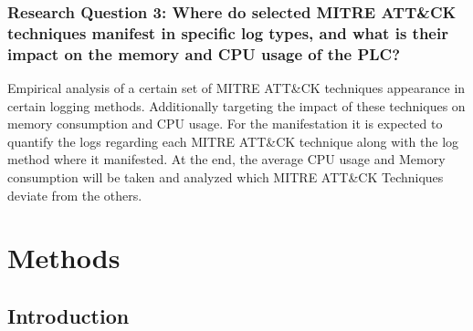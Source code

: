 \documentclass[Master,BMR,english]{twbook}
\begin{document}
\subsection*{Research Question 3: Where do selected MITRE ATT\&CK techniques manifest in specific log types, and what is their impact on the memory and CPU usage of the PLC?}

Empirical analysis of  a certain set of MITRE ATT\&CK techniques appearance in certain logging methods. Additionally targeting the impact of these techniques on memory consumption and CPU usage.  For the manifestation it is expected to quantify the logs regarding each MITRE ATT\&CK technique along with the log method where it manifested. At the end, the average CPU usage and Memory consumption will be taken and analyzed which MITRE ATT\&CK Techniques deviate from the others.


\chapter{Methods}

\section{Introduction}
\end{document}
